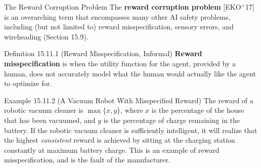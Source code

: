 \documentclass[aspectratio=169,10pt]{beamer}
\begin{document}
\begin{frame}{The Reward Corruption Problem}
  The \textbf{reward corruption problem} [EKO$^+$17] is an overarching
  term that encompasses many other AI safety problems, including (but not
  limited to) reward misspecification, sensory errors, and wireheading
  (Section 15.9).

  \begin{block}{Definition 15.11.1 (Reward Misspecification, Informal)}
    \textbf{Reward misspecification} is when the utility function for the
    agent, provided by a human, does not accurately model what the human
    would actually like the agent to optimize for.
  \end{block}

  \begin{block}{Example 15.11.2 (A Vacuum Robot With Misspecified Reward)}
    The reward of a robotic vacuum cleaner is $\max\{x,y\}$, where $x$ is
    the percentage of the house that has been vacuumed, and $y$ is the
    percentage of charge remaining in the battery. If the robotic vacuum
    cleaner is sufficiently intelligent, it will realize that the highest
    \emph{consistent} reward is achieved by sitting at the charging
    station constantly at maximum battery charge. This is an example of
    reward misspecification, and is the fault of the manufacturer.
  \end{block}
\end{frame}
\end{document}
